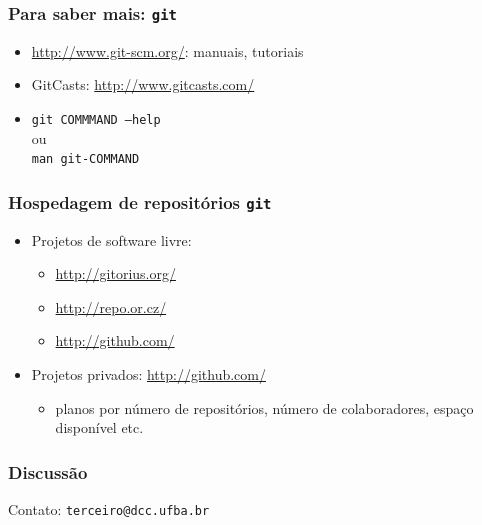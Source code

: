 \documentclass{beamer}
\newcommand{\git}{\texttt{git}}
\begin{document}
\begin{frame}
  \frametitle{Para saber mais: \git}
  \begin{itemize}
    \item \url{http://www.git-scm.org/}: manuais, tutoriais
    \item GitCasts: \url{http://www.gitcasts.com/}
    \item \texttt{git COMMMAND --help}\\
      ou\\
      \texttt{man git-COMMAND}
  \end{itemize}
\end{frame}

\begin{frame}
  \frametitle{Hospedagem de repositórios \git}
  \begin{itemize}
    \item Projetos de software livre:
      \begin{itemize}
        \item \url{http://gitorius.org/}
        \item \url{http://repo.or.cz/}
        \item \url{http://github.com/}
      \end{itemize}

    \item Projetos privados: \url{http://github.com/}
      \begin{itemize}
        \item planos por número de repositórios, número de
          colaboradores, espaço disponível etc.
      \end{itemize}
  \end{itemize}
\end{frame}

\begin{frame}
  \frametitle{Discussão}
  \begin{center}
    Contato: \texttt{terceiro@dcc.ufba.br}
  \end{center}
\end{frame}
\end{document}
